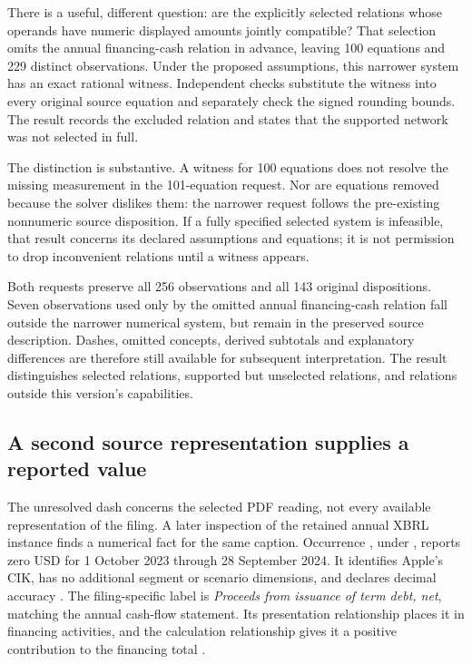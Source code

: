 There is a useful, different question: are the explicitly selected relations
whose operands have numeric displayed amounts jointly compatible? That selection
omits the annual financing-cash relation in advance, leaving 100 equations and
229 distinct observations. Under the proposed assumptions, this narrower system
has an exact rational witness. Independent checks substitute the witness into
every original source equation and separately check the signed rounding bounds.
The result records the excluded relation and states that the supported network
was not selected in full.

The distinction is substantive. A witness for 100 equations does not resolve
the missing measurement in the 101-equation request. Nor are equations removed
because the solver dislikes them: the narrower request follows the pre-existing
nonnumeric source disposition. If a fully specified selected system is
infeasible, that result concerns its declared assumptions and equations; it is
not permission to drop inconvenient relations until a witness appears.

Both requests preserve all 256 observations and all 143 original dispositions.
Seven observations used only by the omitted annual financing-cash relation
fall outside the narrower numerical system, but remain in the preserved source
description. Dashes, omitted concepts, derived subtotals and explanatory
differences are therefore still available for subsequent interpretation.
The result distinguishes selected relations, supported but unselected relations,
and relations outside this version's capabilities.

\enlargethispage{\baselineskip}
\subsection{A second source representation supplies a reported value}
\label{sec:debt-selected-reading}

The unresolved dash concerns the selected PDF reading, not every available
representation of the filing. A later inspection of the retained annual XBRL
instance finds a numerical fact for the same caption. Occurrence
, under , reports zero
USD for 1 October 2023 through 28 September 2024. It identifies Apple's CIK,
has no additional segment or scenario dimensions, and declares decimal
accuracy . The filing-specific label is \emph{Proceeds from issuance of
term debt, net}, matching the annual cash-flow statement. Its presentation
relationship places it in financing activities, and the calculation
relationship gives it a positive contribution to the financing total
\citep[retained instance, occurrence f-325, context c-1; associated label,
presentation and calculation relationships]{apple2024xbrlinstance}.

